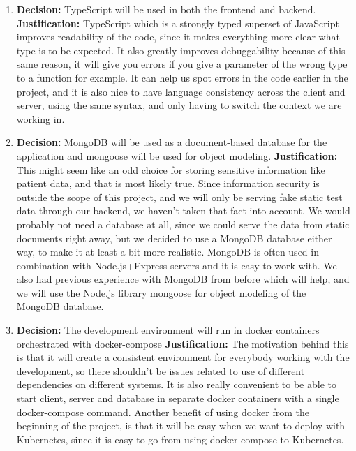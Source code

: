 \documentclass{article}
\begin{document}
\begin{enumerate}
      \item \textbf{Decision:} TypeScript will be used in both the frontend and backend.
    \linebreak{}
    \textbf{Justification:} TypeScript which is a strongly typed superset of JavaScript improves readability of the code, since it makes everything more clear what type is to be expected. It also greatly improves debuggability because of this same reason, it will give you errors if you give a parameter of the wrong type to a function for example. It can help us spot errors in the code earlier in the project, and it is also nice to have language consistency across the client and server, using the same syntax, and only having to switch the context we are working in. 
    
     \item \textbf{Decision:} MongoDB will be used as a document-based database for the application and mongoose will be used for object modeling.
    \linebreak{}
    \textbf{Justification:} This might seem like an odd choice for storing sensitive information like patient data, and that is most likely true. Since information security is outside the scope of this project, and we will only be serving fake static test data through our backend, we haven't taken that fact into account. We would probably not need a database at all, since we could serve the data from static documents right away, but we decided to use a MongoDB database either way, to make it at least a bit more realistic. MongoDB is often used in combination with Node.js+Express servers and it is easy to work with. We also had previous experience with MongoDB from before which will help, and we will use the Node.js library mongoose for object modeling of the MongoDB database.
    
      \item \textbf{Decision:} The development environment will run in docker containers orchestrated with docker-compose
    \linebreak{}
    \textbf{Justification:} The motivation behind this is that it will create a consistent environment for everybody working with the development, so there shouldn't be issues related to use of different dependencies on different systems. It is also really convenient to be able to start client, server and database in separate docker containers with a single docker-compose command. Another benefit of using docker from the beginning of the project, is that it will be easy when we want to deploy with Kubernetes, since it is easy to go from using docker-compose to Kubernetes.
    

\end{enumerate}
\end{document}
